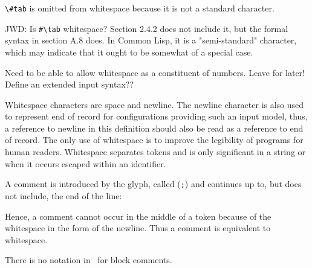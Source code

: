 %
\begin{optPrivate}
    \verb+\#tab+ is omitted from whitespace because it is not a standard
    character.

    JWD: Is \verb+#\tab+ whitespace?  Section 2.4.2 does not include it, but the
    formal syntax in section A.8 does.  In Common Lisp, it is a "semi-standard"
    character, which may indicate that it ought to be somewhat of a special
    case.

    Need to be able to allow whitespace as a constituent of numbers.  Leave for
    later!  Define an extended input syntax??
\end{optPrivate}
%
\begin{optDefinition}
Whitespace characters are space and
newline.  The newline character is also used to represent end of record for
configurations providing such an input model, thus, a reference to newline in
this definition should also be read as a reference to end of record.  The only
use of whitespace is to improve the legibility of programs for human readers.
Whitespace separates tokens and is only significant in a string or when it
occurs escaped within an identifier.

A comment is introduced by the 
 glyph, called 
(\verb+;+) and continues up to, but does not include, the end of the line:
%
\Syntax
{}

Hence, a comment cannot occur in the middle of a token because of the whitespace
in the form of the newline.  Thus a comment is equivalent to whitespace.
%
\begin{note}
    There is no notation in \eulisp\ for block comments.
\end{note}
\end{optDefinition}

